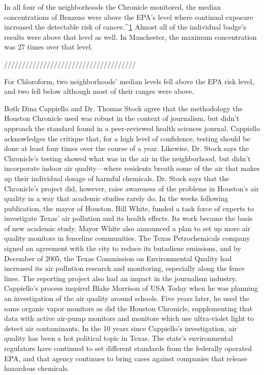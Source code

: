 In all four of the neighborhoods the Chronicle monitored, the median concentrations
of Benzene were above the EPA's level where continual exposure
increased the detectable risk of cancer.^{\href{#endnotes-houston-chronicle}{1}} Almost all of the individual badge's
results were above that level as well. In Manchester, the maximum concentration
was 27 times over that level.

/////////////////////////////////////

For Chloroform, two neighborhoods' median levels fell above the EPA risk
level, and two fell below although most of their ranges were above.



Both Dina Cappiello and Dr. Thomas Stock agree that the methodology
the Houston Chronicle used was robust in the context of journalism, but
didn't approach the standard found in a peer-reviewed health sciences
journal. Cappiello acknowledges the critique that, for a high level of confidence,
testing should be done at least four times over the course of a year.
Likewise, Dr. Stock says the Chronicle's testing showed what was in the air in the neighborhood, but didn't incorporate indoor air quality—where
residents breath some of the air that makes up their individual dosage of
harmful chemicals.
Dr. Stock says that the Chronicle's project did, however, raise awareness of
the problems in Houston's air quality in a way that academic studies rarely
do. In the weeks following publication, the mayor of Houston, Bill White,
funded a task force of experts to investigate Texas' air pollution and its
health effects. Its work became the basis of new academic study. Mayor
White also announced a plan to set up more air quality monitors in fenceline
communities. The Texas Petrochemicals company signed an agreement
with the city to reduce its butadiene emissions, and by December of 2005,
the Texas Commission on Environmental Quality had increased its air pollution
research and monitoring, especially along the fence lines.
The reporting project also had an impact in the journalism industry. Cappiello's
process inspired Blake Morrison of USA Today when he was planning
an investigation of the air quality around schools. Five years later, he used
the same organic vapor monitors as did the Houston Chronicle, supplementing
that data with active air-pump monitors and monitors which use
ultra-violet light to detect air contaminants.
In the 10 years since Cappiello's investigation, air quality has been a hot
political topic in Texas. The state's environmental regulators have continued
to set different standards from the federally operated EPA, and
that agency continues to bring cases against companies that release
hazardous chemicals.

